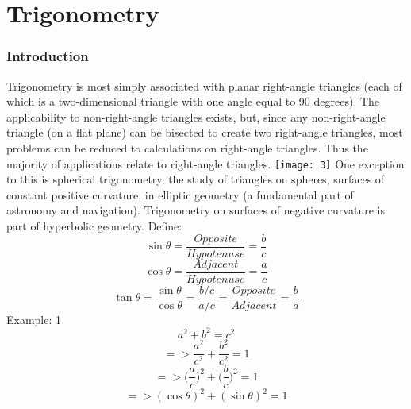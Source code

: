 \graphicspath{ {./Pictures/} }


\chapter{Trigonometry}

\subsection{Introduction}
Trigonometry is most simply associated with planar right-angle triangles (each of which is a two-dimensional triangle with one angle equal to 90 degrees). The applicability to non-right-angle triangles exists, but, since any non-right-angle triangle (on a flat plane) can be bisected to create two right-angle triangles, most problems can be reduced to calculations on right-angle triangles. Thus the majority of applications relate to right-angle triangles.
\texttt{[image: 3]}
One exception to this is spherical trigonometry, the study of triangles on spheres, surfaces of constant positive curvature, in elliptic geometry (a fundamental part of astronomy and navigation). Trigonometry on surfaces of negative curvature is part of hyperbolic geometry.
\newline
Define:
\newline
\begin{equation}
\sin\theta = \frac{Opposite}{Hypotenuse} = \frac{b}{c}
\end{equation}
\begin{equation}
\cos\theta = \frac{Adjacent}{Hypotenuse} = \frac{a}{c}
\end{equation}
\begin{equation}
\tan\theta = \frac{\sin\theta}{\cos\theta}= \frac{b/c}{a/c} = \frac{Opposite}{Adjacent} = \frac{b}{a}
\end{equation}
\newpage
Example: 1
\begin{equation}
a^2+b^2=c^2
\end{equation}
\begin{displaymath}
=>\frac{a^2}{c^2}+\frac{b^2}{c^2} = 1
\end{displaymath}
\begin{displaymath}
=> \bigg(\frac{a}{c}\bigg)^2 + \bigg(\frac{b}{c}\bigg)^2 = 1
\end{displaymath}
\begin{displaymath}
=> (\cos\theta)^2+(\sin\theta)^2 = 1
\end{displaymath}
